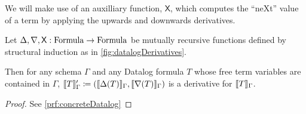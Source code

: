 \newcommand{\bothdiff}{{\mathsf X}} 

We will make use of an auxilliary function, $\bothdiff$, which computes the
``neXt'' value of a term by applying the upwards and downwards derivatives.

\newcommand{\bothchanges}{\rho}
\begin{thm}[name=Concrete Datalog formula derivatives, restate=concreteDatalog]
\label{thm:concreteDatalog}
  Let $\updiff, \downdiff, \bothdiff : \Formula \rightarrow \Formula$ be mutually recursive functions
  defined by structural induction as in \cref{fig:datalogDerivatives}.

  Then for any schema $\Gamma$ and any Datalog formula $T$ whose free term variables are contained
  in $\Gamma$,
  $\llbracket T \rrbracket_\Gamma' \coloneqq (\llbracket \Delta(T) \rrbracket_\Gamma, \llbracket \nabla(T) \rrbracket_\Gamma)$
  is a derivative for $\llbracket T \rrbracket_\Gamma$.
\end{thm}
\ifproofs
\begin{proof}
  See \cref{prf:concreteDatalog}
\end{proof}
\fi

